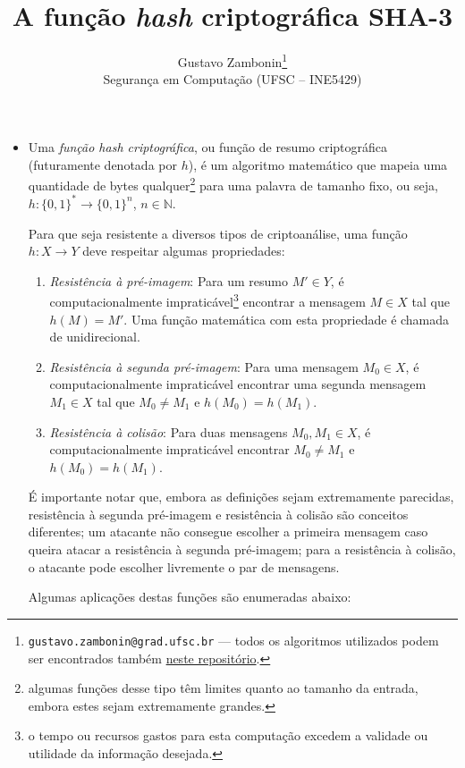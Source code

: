 \documentclass{article}
\title{\textbf{A função \emph{hash} criptográfica SHA-3}}
\author{Gustavo Zambonin\thanks{\texttt{gustavo.zambonin@grad.ufsc.br} ---
todos os algoritmos utilizados podem ser encontrados
também \href{https://github.com/zambonin/ufsc-ine5429}{neste repositório}.} \\
\small {Segurança em Computação (UFSC -- INE5429)} \vspace{-5mm}}
\date{}
\begin{document}
\maketitle

\begin{itemize}

\item Uma \emph{função hash criptográfica}, ou função de resumo criptográfica 
(futuramente denotada por $h$), é um algoritmo matemático que mapeia uma
quantidade de bytes qualquer\footnote{algumas funções desse tipo têm
limites quanto ao tamanho da entrada, embora estes sejam extremamente
grandes.} para uma palavra de tamanho fixo, ou seja,
$h : \{0, 1\}^{*} \longrightarrow \{0, 1\}^{n}$, $n \in \mathbb{N}$.

Para que seja resistente a diversos tipos de criptoanálise, uma função
$h : X \longrightarrow Y$ deve respeitar algumas propriedades:

\begin{enumerate}[label=\roman*.]

\item \emph{Resistência à pré-imagem}: Para um resumo $M' \in Y$, é
computacionalmente impraticável\footnote{o tempo ou recursos gastos para esta
computação excedem a validade ou utilidade da informação desejada.} encontrar a
mensagem $M \in X$ tal que $h(M) = M'$. Uma função matemática com esta
propriedade é chamada de unidirecional.

\item \emph{Resistência à segunda pré-imagem}: Para uma mensagem $M_0 \in X$,
é computacionalmente impraticável encontrar uma segunda mensagem $M_1 \in X$
tal que $M_0 \neq M_1$ e $h(M_0) = h(M_1)$.

\item \emph{Resistência à colisão}: Para duas mensagens $M_0, M_1 \in X$, é
computacionalmente impraticável encontrar $M_0 \neq M_1$ e $h(M_0) = h(M_1)$.

\end{enumerate}

É importante notar que, embora as definições sejam extremamente parecidas,
resistência à segunda pré-imagem e resistência à colisão são conceitos
diferentes; um atacante não consegue escolher a primeira mensagem caso queira
atacar a resistência à segunda pré-imagem; para a resistência à colisão, o
atacante pode escolher livremente o par de mensagens.

Algumas aplicações destas funções são enumeradas abaixo:


\end{itemize}
\end{document}
